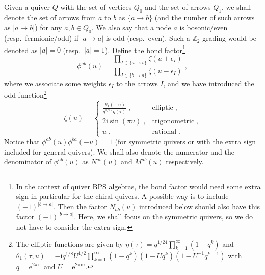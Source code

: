 \documentclass[11pt]{article}
\numberwithin{equation}{section}
\numberwithin{figure}{section}
\numberwithin{table}{section}
\newcommand{\ii}{\mathrm{i}}
\begin{document}
Given a quiver $Q$ with the set of vertices $Q_0$ and the set of arrows $Q_1$, we shall denote the set of arrows from $a$ to $b$ as $\{a\rightarrow b\}$ (and the number of such arrows as $|a\rightarrow b|$) for any $a,b\in Q_0$. We also say that a node $a$ is bosonic/even (resp.~fermionic/odd) if $|a\rightarrow a|$ is odd (resp.~even). Such a $\mathbb{Z}_2$-grading would be denoted as $|a|=0$ (resp.~$|a|=1$). Define the bond factor\footnote{In the context of quiver BPS algebras, the bond factor would need some extra sign in particular for the chiral quivers. A possible way is to include $(-1)^{|b\rightarrow a|}$. Then the factor $N_{ab}(u)$ introduced below should also have this factor $(-1)^{|b\rightarrow a|}$. Here, we shall focus on the symmetric quivers, so we do not have to consider the extra sign.}
\begin{equation}
	\phi^{ab}(u)=\frac{\prod\limits_{I\in{\{a\rightarrow b\}}}\zeta(u+\epsilon_I)}{\prod\limits_{I\in{\{b\rightarrow a\}}}\zeta(u-\epsilon_I)}\;,
\end{equation}
where we associate some weights $\epsilon_I$ to the arrows $I$, and we have introduced the odd function\footnote{The elliptic functions are given by $\eta(\tau)=q^{1/24}\prod\limits_{k=1}^\infty(1-q^k)$ and $\theta_1(\tau,u)=-\ii q^{1/8}U^{1/2}\prod\limits_{k=1}^\infty\left(1-q^k\right)\left(1-Uq^k\right)\left(1-U^{-1}q^{k-1}\right)$ with $q=\mathrm{e}^{2\pi\ii\tau}$ and $U=\mathrm{e}^{2\pi\ii u}$.}
\begin{equation}
	\zeta(u)=\begin{cases}
		\frac{\ii\theta_1(\tau,u)}{q^{1/12}\eta(\tau)}\;,&\text{elliptic}\;,\\
		2\ii\sin(\pi u)\;,&\text{trigonometric}\;,\\
		u\;,&\text{rational}\;.
	\end{cases}
\end{equation}
Notice that $\phi^{ab}(u)\phi^{ba}(-u)=1$ (for symmetric quivers or with the extra sign included for general quivers). We shall also denote the numerator and the denominator of $\phi^{ab}(u)$ as $N^{ab}(u)$ and $M^{ab}(u)$ respectively.
\end{document}
